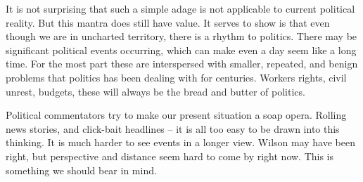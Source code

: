    It is not surprising that such a simple adage is not applicable to
   current political reality. But this mantra does still have value. It
   serves to show is that even though we are in uncharted territory, there
   is a rhythm to politics. There may be significant political events
   occurring, which can make even a day seem like a long time. For the
   most part these are interspersed with smaller, repeated, and benign
   problems that politics has been dealing with for centuries. Workers
   rights, civil unrest, budgets, these will always be the bread and
   butter of politics.

   Political commentators try to make our present situation a soap opera.
   Rolling news stories, and click-bait headlines -- it is all too easy to
   be drawn into this thinking. It is much harder to see events in a
   longer view. Wilson may have been right, but perspective and distance
   seem hard to come by right now. This is something we should bear in
   mind.

